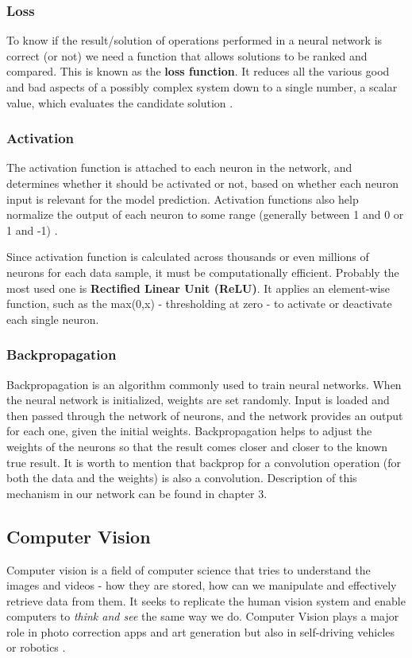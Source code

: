 \documentclass[../Main.tex]{subfiles}
\begin{document}
    \subsubsection{Loss}
    To know if the result/solution of operations performed in a neural network is correct (or not) we need a function that allows solutions to be ranked and compared. This is known as the \textbf{loss function}. It reduces all the various good and bad aspects of a possibly complex system down to a single number, a scalar value, which evaluates the candidate solution \cite{neuralsmithingbook}. 
    
    \subsubsection{Activation}
    The activation function is attached to each neuron in the network, and determines whether it should be activated or not, based on whether each neuron input is relevant for the model prediction. Activation functions also help normalize the output of each neuron to some range (generally between 1 and 0 or 1 and -1) \cite{missinglink}. 

    Since activation function is calculated across thousands or even millions of neurons for each data sample, it  must be computationally efficient. Probably the most used one is \textbf{Rectified Linear Unit (ReLU)}. It applies an element-wise  function, such as the max(0,x) - thresholding at zero - to activate or deactivate each single neuron.
    
    \subsubsection{Backpropagation}
    
    Backpropagation is an algorithm commonly used to train neural networks. When the neural network is initialized, weights are set randomly. Input is loaded and then passed through the network of neurons, and the network provides an output for each one, given the initial weights. Backpropagation helps to adjust the weights of the neurons so that the result comes closer and closer to the known true result. It is worth to mention that backprop for a convolution operation (for both the data and the weights) is also a convolution. Description of this mechanism in our network can be found in chapter 3.

\subsection{Computer Vision}
    Computer vision is a field of computer science that tries to understand the images and videos - how they are stored, how can we manipulate and effectively retrieve data from them. It seeks to replicate the human vision system and enable computers to \textit{think and see} the same way we do. Computer Vision plays a major role in photo correction apps and art generation but also in self-driving vehicles or robotics \cite{towardsdatascience}.
    
\end{document}
